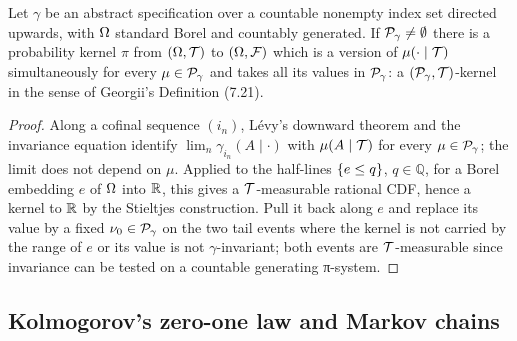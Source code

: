 \begin{proposition}
    \label{prop:app-pa-kernel}
    \leanok

    Let $\gamma$ be an abstract specification over a countable nonempty index set directed
    upwards, with $\Omega$ standard Borel and countably generated.  If
    $\mathcal{P}_\gamma \neq \emptyset$ there is a probability kernel $\pi$ from $(\Omega, \mathcal{T})$ to
    $(\Omega, \mathcal{F})$ which is a version of $\mu(\cdot \mid \mathcal{T})$ simultaneously for
    every $\mu \in \mathcal{P}_\gamma$ and takes all its values in $\mathcal{P}_\gamma$: a
    $(\mathcal{P}_\gamma, \mathcal{T})$-kernel in the sense of Georgii's Definition (7.21).
\end{proposition}
\begin{proof}
    \leanok

    Along a cofinal sequence $(i_n)$, Lévy's downward theorem and the invariance equation
    identify $\lim_n \gamma_{i_n}(A \mid \cdot)$ with $\mu(A \mid \mathcal{T})$ for every
    $\mu \in \mathcal{P}_\gamma$; the limit does not depend on $\mu$.  Applied to the half-lines
    $\left\{ e \le q \right\}$, $q \in \mathbb{Q}$, for a Borel embedding $e$ of $\Omega$ into $\mathbb{R}$, this
    gives a $\mathcal{T}$-measurable rational CDF, hence a kernel to $\mathbb{R}$ by the Stieltjes
    construction.  Pull it back along $e$ and replace its value by a fixed
    $\nu_0 \in \mathcal{P}_\gamma$ on the two tail events where the kernel is not carried by the range
    of $e$ or its value is not $\gamma$-invariant; both events are $\mathcal{T}$-measurable since
    invariance can be tested on a countable generating π-system.
\end{proof}

\subsection*{Kolmogorov's zero-one law and Markov chains}

